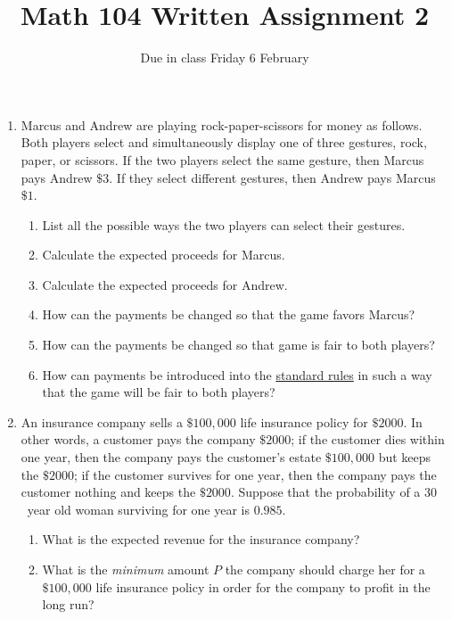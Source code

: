 \documentclass[12pt]{article}
\author{}\date{Due in class Friday 6 February}
\title{Math 104 Written Assignment 2}\author{}
\begin{document}
\maketitle
\pagestyle{empty}

\begin{enumerate}
\item Marcus and Andrew are playing rock-paper-scissors
for money as follows. Both players select and simultaneously display
one of three gestures, rock, paper, or scissors.
If the two players select the same gesture, then Marcus pays Andrew 
$\$3$. If they select different gestures, then Andrew pays Marcus $\$1$.
\begin{enumerate}
\item List all the possible ways
the two players can select their gestures.
\vspace{.6in}
\item Calculate the expected proceeds for Marcus.
\vspace{.6in}
\item Calculate the expected proceeds for Andrew.
\vspace{.6in}
\item How can the payments be changed so that the game favors Marcus?
\vspace{.6in}
\item How can the payments be changed so that game is fair to both
players?
\vspace{.6in}
\item How can payments be introduced into the
\href{http://en.wikipedia.org/wiki/Rock-paper-scissors}{standard rules}
in such a way that the game will be fair to both players?
\end{enumerate}
\newpage

\item An insurance company sells a $\$100,000$
life insurance policy for $\$2000$. 
In other words, a customer pays the company $\$2000$;
if the customer dies within one year, then the company
pays the customer's estate $\$100,000$ but keeps the $\$2000$;
if the customer survives for one year, then
the company pays the customer nothing and keeps the $\$2000$. 
Suppose that the probability of a $30$~year old woman surviving
for one year is $0.985$.
\begin{enumerate}
\item What is the expected revenue for the insurance company?
\vspace{2in}
\item What is the {\em minimum} amount $P$ the
company should charge her for a $\$100,000$ life
insurance policy in order
for the company to profit in the long run?
\end{enumerate}
\end{enumerate}
\end{document}
